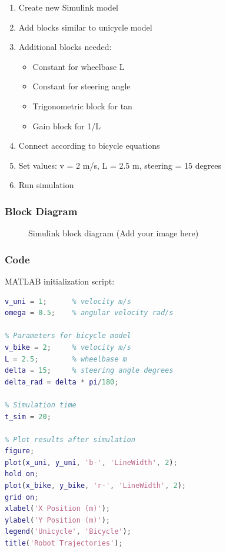 \begin{enumerate}
	\item Create new Simulink model
	\item Add blocks similar to unicycle model
	\item Additional blocks needed:
	\begin{itemize}
		\item Constant for wheelbase L
		\item Constant for steering angle
		\item Trigonometric block for tan
		\item Gain block for 1/L
	\end{itemize}
	\item Connect according to bicycle equations
	\item Set values: v = 2 m/s, L = 2.5 m, steering = 15 degrees
	\item Run simulation
\end{enumerate}

\subsubsection{Block Diagram}
\begin{figure}[h]
	\centering
	\caption{Simulink block diagram (Add your image here)}
	\label{fig:model}
\end{figure}

\subsubsection{Code}
MATLAB initialization script:
\begin{lstlisting}[language=Matlab]
% Parameters for unicycle model
v_uni = 1;      % velocity m/s
omega = 0.5;    % angular velocity rad/s

% Parameters for bicycle model
v_bike = 2;     % velocity m/s
L = 2.5;        % wheelbase m
delta = 15;     % steering angle degrees
delta_rad = delta * pi/180;

% Simulation time
t_sim = 20;

% Plot results after simulation
figure;
plot(x_uni, y_uni, 'b-', 'LineWidth', 2);
hold on;
plot(x_bike, y_bike, 'r-', 'LineWidth', 2);
grid on;
xlabel('X Position (m)');
ylabel('Y Position (m)');
legend('Unicycle', 'Bicycle');
title('Robot Trajectories');
\end{lstlisting}

